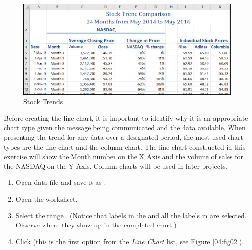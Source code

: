 \begin{figure}[H]
	\centering
	\includegraphics[width=\maxwidth{.95\linewidth}]{gfx/ch04_fig01}
	\caption{Stock Trends}
	\label{04:fig01}
\end{figure}

Before creating the line chart, it is important to identify why it is an appropriate chart type given the message being communicated and the data available. When presenting the trend for any data over a designated period, the most used chart types are the line chart and the column chart. The line chart constructed in this exercise will show the Month number on the X Axis and the volume of sales for the NASDAQ on the Y Axis. Column charts will be used in later projects.

\begin{enumerate}
	\item Open data file  and save it as .
	\item Open the  worksheet.
	\item Select the range . (Notice that labels in the  and all the labels in  are selected. Observe where they show up in the completed chart.)
	\item Click  (this is the first option from the \textit{Line Chart} list, see Figure \ref{04:fig02}).
\end{enumerate}

